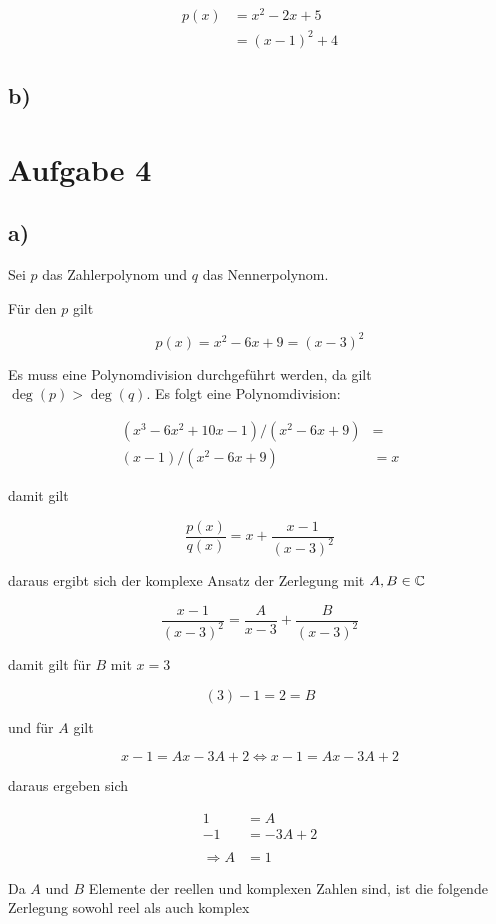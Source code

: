 \documentclass[a4paper, 11pt]{article}
\begin{document}
\begin{align*}
    p(x) &= x^2 - 2x + 5 \\
    &= (x - 1)^2 + 4
\end{align*}

\subsection{b)}
\label{sec:orgcd6afdf}
\section{Aufgabe 4}
\label{sec:orgc8553fa}
\subsection{a)}
\label{sec:org97e4fed}
Sei \(p\) das Zahlerpolynom und \(q\) das Nennerpolynom.

Für den \(p\) gilt

$$ p(x) = x^2 - 6x + 9 = (x - 3)^2 $$

Es muss eine Polynomdivision durchgeführt werden, da gilt \(\deg(p) > \deg(q)\).
Es folgt eine Polynomdivision:

\begin{align*}
    (x^3 - 6x^2 + 10x - 1) / (x^2 - 6x + 9) &= \\
    (x - 1) / (x^2 - 6x + 9) &= x 
\end{align*}

damit gilt

$$ \frac{p(x)}{q(x)} = x + \frac{x - 1}{(x - 3)^2} $$

daraus ergibt sich der komplexe Ansatz der Zerlegung mit \(A, B \in \mathbb{C}\)

$$ \frac{x - 1}{(x - 3)^2} = \frac{A}{x - 3} + \frac{B}{(x - 3)^2} $$

damit gilt für \(B\) mit \(x = 3\)

$$ (3) - 1 = 2 = B $$

und für \(A\) gilt

$$ x - 1 = Ax - 3A + 2 \Leftrightarrow x - 1 = Ax - 3A + 2 $$

daraus ergeben sich

\begin{align*}
    1 &= A \\
    -1 &= -3A + 2 \\
    \\
    \Rightarrow A &= 1
\end{align*}

Da \(A\) und \(B\) Elemente der reellen und komplexen Zahlen sind, ist die folgende Zerlegung
sowohl reel als auch komplex
\end{document}
